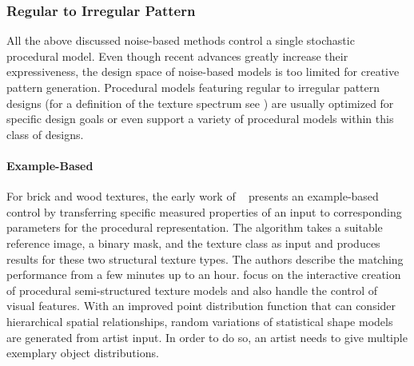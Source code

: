 \subsubsection{Regular to Irregular Pattern}
\label{subsubsec:analysis_distribution_and_repetition_regular}

All the above discussed noise-based methods control a single stochastic procedural model. Even though recent advances greatly increase their expressiveness, the design space of noise-based models is too limited for creative pattern generation. Procedural models featuring regular to irregular pattern designs (for a definition of the texture spectrum see \cite{lin_2006_qeo}) are usually optimized for specific design goals or even support a variety of procedural models within this class of designs.

\paragraph*{Example-Based}
\label{para:analysis_regular_example}

For brick and wood textures, the early work of \citeauthor*{lefebvre_2000_ass}~\cite{lefebvre_2000_ass} presents an example-based control by transferring specific measured properties of an input to corresponding parameters for the procedural representation. The algorithm takes a suitable reference image, a binary mask, and the texture class as input and produces results for these two structural texture types. The authors describe the matching performance from a few minutes up to an hour. \cite{gilet_2012_map} focus on the interactive creation of procedural semi-structured texture models and also handle the control of visual features. With an improved point distribution function that can consider hierarchical spatial relationships, random variations of statistical shape models are generated from artist input. In order to do so, an artist needs to give multiple exemplary object distributions. 

